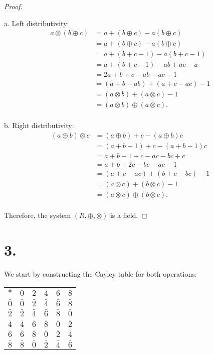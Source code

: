 \documentclass{article}
\begin{document}
\begin{proof}
  $ $

  a. Left distributivity: 
  \begin{align*}
    a \otimes (b \oplus c) &= a + (b \oplus c) - a(b \oplus c) \\
    &= a + (b \oplus c) - a(b \oplus c) \\
    &= a + (b + c -1) - a(b + c - 1) \\
    &= a + (b + c - 1) - ab + ac - a \\
    &= 2a + b + c -ab - ac - 1 \\
    &= (a + b - ab) + (a + c - ac) - 1 \\
    &= (a \otimes b) + (a \otimes c) - 1 \\
    &= (a \otimes b) \oplus (a \otimes c). \\
  \end{align*}

  b. Right distributivity:
  \begin{align*}
    (a \oplus b) \otimes c &= (a \oplus b) + c - (a \oplus b)c \\
    &= (a+b-1) + c - (a+b-1)c \\
    &= a+b-1 + c - ac - bc + c \\
    &= a+b+2c-bc-ac-1 \\
    &= (a + c - ac) + (b + c - bc) - 1 \\
    &= (a \otimes c) + (b \otimes c) - 1 \\
    &= (a \otimes c) \oplus (b \otimes c). \\
  \end{align*}

  \noindent
  Therefore, the system $(R, \oplus, \otimes)$ is a field.
\end{proof}


\section*{3.}

We start by constructing the Cayley table for both operations:
\newline

\begin{tabular}{c | c c c c c}
  $*$ & $\bar{0}$ & $\bar{2}$ & $\bar{4}$ & $\bar{6}$ & $\bar{8}$ \\
  \cline{1-6}
  {$\bar{0}$} & $\bar{0}$ & $\bar{2}$ & $\bar{4}$& $\bar{6}$& $\bar{8}$ \\
  {$\bar{2}$} & $\bar{2}$ & $\bar{4}$ & $\bar{6}$& $\bar{8}$& $\bar{0}$ \\
  {$\bar{4}$} & $\bar{4}$ & $\bar{6}$ & $\bar{8}$& $\bar{0}$& $\bar{2}$ \\
  {$\bar{6}$} & $\bar{6}$ & $\bar{8}$ & $\bar{0}$& $\bar{2}$& $\bar{4}$ \\
  {$\bar{8}$} & $\bar{8}$ & $\bar{0}$ & $\bar{2}$& $\bar{4}$& $\bar{6}$ \\
\end{tabular}
\newline
\newline
\end{document}
